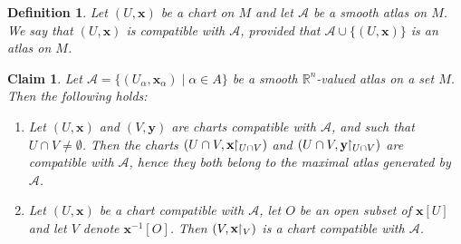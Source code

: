 \documentclass[11pt,a4paper,twoside,openany]{report}
\theoremstyle{my-theorem}
\newtheorem{claim}[theorem]{Claim}
\theoremstyle{non-theorem}
\newtheorem{definition}[theorem]{Definition}
\begin{document}
		\begin{definition}
			Let $(U, \mathbf x)$ be a chart on $M$ and let $\mathcal A$ be a smooth atlas on $M$. We say that $(U, \mathbf x)$ is \emph{compatible} with $\mathcal A$, provided that $\mathcal A \cup \{(U, \mathbf x)\}$ is an atlas on $M$.
		\end{definition}
	
		\begin{claim}
			\label{claim:compatible-charts}
			Let $\mathcal A = \{(U_\alpha, \mathbf x_\alpha) \mid \alpha \in A\}$ be a smooth $\mathbb R^n$-valued atlas on a set $M$. Then the following holds:
			\begin{enumerate}[label=\rm(\roman*)]
				\item Let $(U,\mathbf x)$ and $(V, \mathbf y)$ are charts compatible with $\mathcal A$, and such that $U \cap V \neq \emptyset$. Then the charts $(U \cap V, \mathbf x \!\!\upharpoonright_{U \cap V})$ and $(U \cap V, \mathbf y \!\!\upharpoonright_{U \cap V})$ are compatible with $\mathcal A$, hence they both belong to the maximal atlas generated by $\mathcal A$.
				
				\item Let $(U, \mathbf x)$ be a chart compatible with $\mathcal A$, let $O$ be an open subset of $\mathbf x[U]$ and let $V$ denote $\mathbf x^{-1}[O]$. Then $(V,\mathbf x \!\!\upharpoonright_V)$ is a chart compatible with $\mathcal A$.
			\end{enumerate}
		\end{claim}
	
\end{document}
